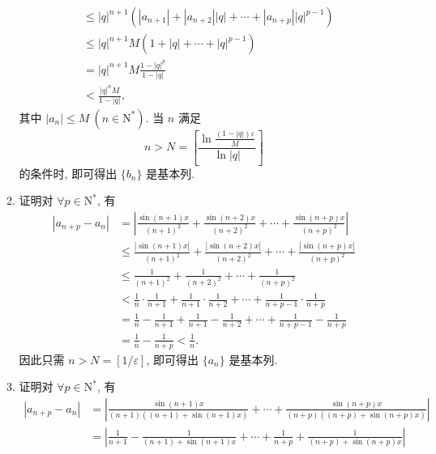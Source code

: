 \begin{enumerate}
\begin{enumerate}[(1)]
\begin{align*}
                                    &\leqslant |q|^{n+1}(|a_{n+1}| + |a_{n+2}||q| + \cdots + |a_{n+p}||q|^{p-1}) \\
                                    &\leqslant |q|^{n+1}M (1 + |q| + \cdots + |q|^{p-1}) \\
                                    &=|q|^{n+1}M\frac{1-|q|^p}{1-|q|} \\
                                    &< \frac{|q|^nM}{1-|q|},
                \end{align*}
                其中 $|a_n| \leqslant M\ (n \in \mathrm{N}^*)$. 当 $n$ 满足
                \[
                    n > N = \left[\frac{\ln\frac{(1-|q|)\varepsilon}{M}}{\ln|q|}\right]    
                \]
                的条件时, 即可得出 $\{b_n\}$ 是基本列.
            \item {\heiti 证明}\quad 对 $\forall p \in \mathrm{N}^*$, 有
                \begin{align*}
                    |a_{n+p} - a_n| &= \left| \frac{\sin(n+1)x}{(n+1)^2} + \frac{\sin(n+2)x}{(n+2)^2} + \cdots + \frac{\sin(n+p)x}{(n+p)^2} \right| \\
                                    &\leqslant \frac{|\sin(n+1)x|}{(n+1)^2} + \frac{|\sin(n+2)x|}{(n+2)^2} + \cdots + \frac{|\sin(n+p)x|}{(n+p)^2} \\
                                    &\leqslant \frac{1}{(n+1)^2} + \frac{1}{(n+2)^2} + \cdots + \frac{1}{(n+p)^2} \\
                                    &< \frac1n \cdot \frac{1}{n+1} + \frac{1}{n+1} \cdot \frac{1}{n+2} + \cdots + \frac{1}{n+p-1} \cdot \frac{1}{n+p} \\
                                    &= \frac1n - \frac{1}{n+1} + \frac{1}{n+1} - \frac{1}{n+2} + \cdots + \frac{1}{n+p-1} - \frac{1}{n+p} \\
                                    &= \frac1n - \frac{1}{n+p} < \frac1n.
                \end{align*}
                因此只需 $n > N = [1/\varepsilon]$, 即可得出 $\{a_n\}$ 是基本列.
            \item {\heiti 证明}\quad 对 $\forall p \in \mathrm{N}^*$, 有
                \begin{align*}
                    |a_{n+p} - a_n| &= \left| \frac{\sin(n+1)x}{(n+1)((n+1) + \sin(n+1)x)} + \cdots + \frac{\sin(n+p)x}{(n+p)((n+p) + \sin(n+p)x)} \right| \\
                                    &= \left| \frac{1}{n+1} - \frac{1}{(n+1) + \sin(n+1)x} + \cdots + \frac{1}{n+p} + \frac{1}{(n+p) + \sin(n+p)x} \right| \\

\end{align*}
\end{enumerate}
\end{enumerate}
